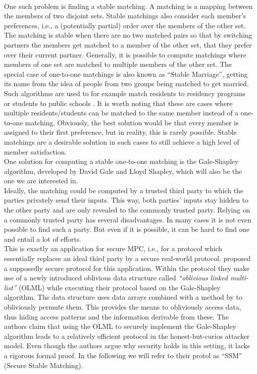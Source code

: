 \ \\One such problem is finding a stable matching. A matching is a mapping between the members of two disjoint sets. Stable matchings also consider each member's preferences, i.e., a (potentially partial) order over the members of the other set. The matching is stable when there are no two matched pairs so that by switching partners the members get matched to a member of the other set, that they prefer over their current partner. Generally, it is possible to compute matchings where members of one set are matched to multiple members of the other set. The special case of one-to-one matchings is also known as ``Stable Marriage'', getting its name from the idea of people from two groups being matched to get married.\\ 
Such algorithms are used to for example match residents to residency programs \citep{nrmp} or students to public schools \citep{sm}. It is worth noting that these are cases where multiple  residents/students can be matched to the same member instead of a one-to-one matching. Obviously, the best solution would be that every member is assigned to their first preference, but in reality, this is rarely possible. Stable matchings are a desirable solution in such cases to still achieve a high level of member satisfaction.\\
One solution for computing a stable one-to-one matching is the Gale-Shapley algorithm, developed by David Gale and Lloyd Shapley, which will also be the one we are interested in.\\ 
Ideally, the matching could be computed by a trusted third party to which the parties privately send their inputs. This way, both parties' inputs stay hidden to the other party and are only revealed to the commonly trusted party.
Relying on a commonly trusted party has several disadvantages. In many cases it is not even possible to find such a party. But even if it is possible, it can be hard to find one and entail a lot of efforts. \\
This is exactly an application for secure MPC, i.e., for a protocol which essentially replaces an ideal third party by a secure real-world protocol. \citet{smas} proposed a supposedly secure protocol for this application. Within the protocol they make use of a newly introduced oblivious data structure called \emph{``oblivious linked multi-list''} (OLML) while executing their protocol based on the Gale-Shapley algorithm. The data structure uses data arrays combined with a method by \citet{rsqo} to obliviously permute them. This provides the means to obliviously access data, thus hiding access patterns and the information derivable from these. The authors claim that using the OLML to securely implement the Gale-Shapley algorithm leads to a relatively efficient protocol in the honest-but-curios attacker model. Even though the authors argue why security holds in this setting, it lacks a rigorous formal proof. In the following we will refer to their protol as ``SSM'' (Secure Stable Matching).\\